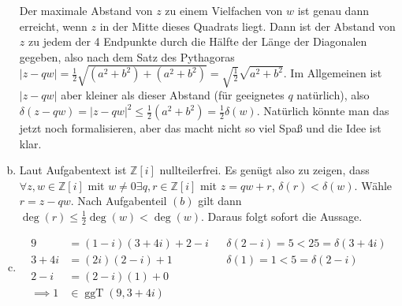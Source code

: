 \documentclass{article}
\theoremstyle{definition}
\newcommand{\Z}{\mathbb{Z}}
\begin{document}
\begin{enumerate}[(a)]
\begin{figure}[ht]
	\end{figure}
	Der maximale Abstand von $z$ zu einem Vielfachen von $w$ ist genau dann erreicht, wenn $z$ in der Mitte dieses Quadrats liegt. Dann ist der Abstand von $z$ zu jedem der 4 Endpunkte durch die Hälfte der Länge der Diagonalen gegeben, also nach dem Satz des Pythagoras $|z - qw| = \frac{1}{2}\sqrt{(a^2 + b^2) + (a^2 + b^2)} = \sqrt{\frac{1}{2}}\sqrt{a^2 + b^2}$. Im Allgemeinen ist $|z - qw|$ aber kleiner als dieser Abstand (für geeignetes $q$ natürlich), also $\delta(z - qw) = |z-qw|^2 \leq \frac{1}{2}(a^2 + b^2) = \frac{1}{2}\delta(w)$. Natürlich könnte man das jetzt noch formalisieren, aber das macht nicht so viel Spaß und die Idee ist klar.
	\item Laut Aufgabentext ist $\Z[i]$ nullteilerfrei. Es genügt also zu zeigen, dass  $\forall z, w\in \Z[i]$ mit $w\neq 0 \exists q, r\in \Z[i]$ mit $z = qw + r$, $\delta(r) <\delta(w)$. Wähle $r = z -qw$. Nach Aufgabenteil $(b)$ gilt dann $\deg(r) \leq \frac{1}{2}\deg(w) < \deg(w)$. Daraus folgt sofort die Aussage.
	\item \begin{align*}
		9 &= (1-i)(3+4i) + 2-i &&\delta(2-i) = 5 < 25 = \delta(3+4i)\\
		3 + 4i &= (2i)(2-i) +1 &&\delta(1) = 1 < 5 = \delta(2-i)\\
		2-i &= (2-i)(1) + 0\\
		\implies 1&\in \operatorname{ggT}(9, 3+4i)
	\end{align*}
\end{enumerate}
\end{document}
